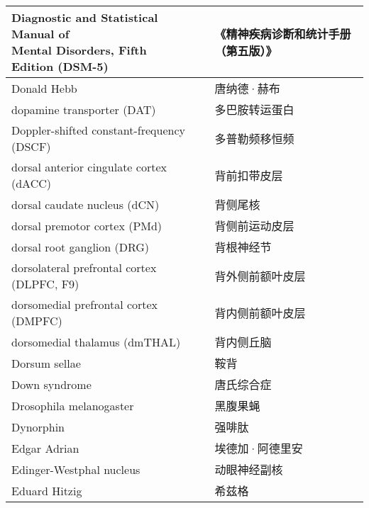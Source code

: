 \begin{longtable}{lll}
	\midrule
	\makecell{Diagnostic and Statistical Manual of \\Mental Disorders, Fifth Edition (DSM-5)}     &&  《精神疾病诊断和统计手册（第五版）》  \\
	
	\midrule
	Donald Hebb    &&  唐纳德·赫布  \\
	
	\midrule
	dopamine transporter (DAT)     &&  多巴胺转运蛋白  \\
	
	\midrule
	Doppler-shifted constant-frequency (DSCF)     &&  多普勒频移恒频  \\
	
	\midrule
	dorsal anterior cingulate cortex (dACC)     &&  背前扣带皮层  \\
	
	\midrule
	dorsal caudate nucleus (dCN)     &&  背侧尾核  \\
	
	\midrule
	dorsal premotor cortex (PMd)     &&  背侧前运动皮层  \\
	
	\midrule
	dorsal root ganglion (DRG)     &&  背根神经节  \\
	
	\midrule
	dorsolateral prefrontal cortex (DLPFC, F9)     &&  背外侧前额叶皮层  \\
	
	\midrule
	dorsomedial prefrontal cortex (DMPFC)     &&  背内侧前额叶皮层  \\
	
	\midrule
	dorsomedial thalamus (dmTHAL)     &&  背内侧丘脑  \\
	
	\midrule
	Dorsum sellae     &&  鞍背  \\
	
	\midrule
	Down syndrome     &&  唐氏综合症  \\
	
	\midrule
	Drosophila melanogaster     &&  黑腹果蝇  \\
	
	\midrule
	Dynorphin     &&  强啡肽  \\
	
	\midrule
	Edgar Adrian     &&  埃德加·阿德里安  \\
	
	\midrule
	Edinger-Westphal nucleus     &&  动眼神经副核  \\
	
	\midrule
	Eduard Hitzig     &&  希兹格  \\
	

\end{longtable}
